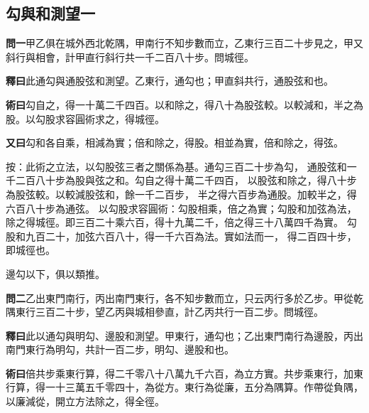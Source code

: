 \documentclass[12pt,a4paper]{article}
\newcommand{\Section}[1]{\subsection*{#1}}
\begin{document}
\vspace{1em}

\Section{勾與和測望一}

\noindent\textbf{問一}\quad 甲乙俱在城外西北乾隅，甲南行不知步數而立，乙東行三百二十步見之，甲又斜行與相會，計甲直行斜行共一千二百八十步。問城徑。

\vspace{0.3em}

\noindent\textbf{釋曰}\quad 此通勾與通股弦和測望。乙東行，通勾也；甲直斜共行，通股弦和也。

\vspace{0.3em}

\noindent\textbf{術曰}\quad 勾自之，得一十萬二千四百。以和除之，得八十為股弦較。以較減和，半之為股。以勾股求容圓術求之，得城徑。

\vspace{0.3em}

\noindent\textbf{又曰}\quad 勾和各自乘，相減為實；倍和除之，得股。相並為實，倍和除之，得弦。

\vspace{0.5em}
\noindent
按：此術之立法，以勾股弦三者之關係為基。通勾三百二十步為勾，
通股弦和一千二百八十步為股與弦之和。勾自之得十萬二千四百，
以股弦和除之，得八十步為股弦較。以較減股弦和，餘一千二百步，
半之得六百步為通股。加較半之，得六百八十步為通弦。
以勾股求容圓術：勾股相乘，倍之為實；勾股和加弦為法，
除之得城徑。即三百二十乘六百，得十九萬二千，倍之得三十八萬四千為實。
勾股和九百二十，加弦六百八十，得一千六百為法。實如法而一，
得二百四十步，即城徑也。

\vspace{0.5em}

邊勾以下，俱以類推。

\vspace{0.5em}

\noindent\textbf{問二}\quad 乙出東門南行，丙出南門東行，各不知步數而立，只云丙行多於乙步。甲從乾隅東行三百二十步，望乙丙與城相參直，計乙丙共行一百二步。問城徑。

\vspace{0.3em}

\noindent\textbf{釋曰}\quad 此以通勾與明勾、邊股和測望。甲東行，通勾也；乙出東門南行為邊股，丙出南門東行為明勾，共計一百二步，明勾、邊股和也。

\vspace{0.3em}

\noindent\textbf{術曰}\quad 倍共步乘東行算，得二千零八十八萬九千六百，為立方實。共步乘東行，加東行算，得一十三萬五千零四十，為從方。東行為從廉，五分為隅算。作帶從負隅，以廉減從，開立方法除之，得全徑。
\end{document}
